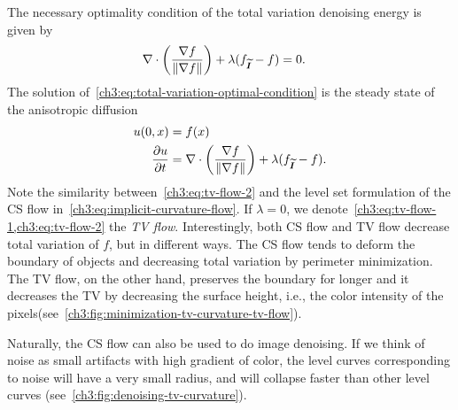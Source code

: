 The necessary optimality condition of the total variation denoising energy is given by
\begin{align}
	\nabla \cdot \left( \frac{\nabla f}{\lVert\nabla f\rVert} \right) + \lambda( f_{\widetilde{\bm{I}}} - f ) &= 0.
	\label{ch3:eq:total-variation-optimal-condition}
\end{align}
%
The solution of~\cref{ch3:eq:total-variation-optimal-condition} is the steady state of the  anisotropic diffusion
\begin{align}
	u(0,x) &= f(x) 	\label{ch3:eq:tv-flow-1} \\
	\frac{\partial u}{\partial t} &= \nabla \cdot \left( \frac{\nabla f}{\lVert\nabla f\rVert} \right) + \lambda( f_{\widetilde{\bm{I}}} - f ). \label{ch3:eq:tv-flow-2}
\end{align}
%
Note the similarity between~\cref{ch3:eq:tv-flow-2} and the level set formulation of the CS flow in~\cref{ch3:eq:implicit-curvature-flow}. If $\lambda=0$, we denote~\cref{ch3:eq:tv-flow-1,ch3:eq:tv-flow-2} the \emph{TV flow}\cite{bellettini02total}. Interestingly, both CS flow and TV flow decrease total variation of $f$, but in different ways. The CS flow tends to deform the boundary of objects and decreasing total variation by perimeter minimization. The TV flow, on the other hand, preserves the boundary for longer and it decreases the TV by decreasing the surface height, i.e., the color intensity of the pixels(see~\cref{ch3:fig:minimization-tv-curvature-tv-flow}).

Naturally, the CS flow can also be used to do image denoising. If we think of noise as small artifacts with high gradient of color, the level curves corresponding to noise will have a very small radius, and will collapse faster than other level curves (see~\cref{ch3:fig:denoising-tv-curvature}). 


